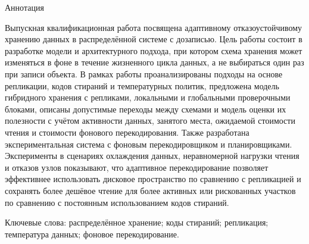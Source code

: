 
Аннотация

Выпускная квалификационная работа посвящена адаптивному отказоустойчивому хранению данных в распределённой системе с дозаписью. Цель работы состоит в разработке модели и архитектурного подхода, при котором схема хранения может изменяться в фоне в течение жизненного цикла данных, а не выбираться один раз при записи объекта. В рамках работы проанализированы подходы на основе репликации, кодов стираний и температурных политик, предложена модель гибридного хранения с репликами, локальными и глобальными проверочными блоками, описаны допустимые переходы между схемами и модель оценки их полезности с учётом активности данных, занятого места, ожидаемой стоимости чтения и стоимости фонового перекодирования. Также разработана экспериментальная система с фоновым перекодировщиком и планировщиками. Эксперименты в сценариях охлаждения данных, неравномерной нагрузки чтения и отказов узлов показывают, что адаптивное перекодирование позволяет эффективнее использовать дисковое пространство по сравнению с репликацией и сохранять более дешёвое чтение для более активных или рискованных участков по сравнению с постоянным использованием кодов стираний.

Ключевые слова: распределённое хранение; коды стираний; репликация; температура данных; фоновое перекодирование.

\pagebreak
